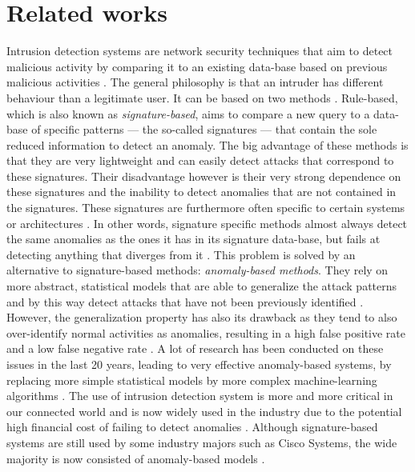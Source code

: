 \section{Related works}
Intrusion detection systems are network security techniques that aim to detect malicious activity by comparing it to an existing data-base based on previous malicious activities \cite{Amudhavel2016AReview}. The general philosophy is that an intruder has different behaviour than a legitimate user. It can be based on two methods \cite{Winter2018}. Rule-based, which is also known as \emph{signature-based}, aims to compare a new query to a data-base of specific patterns --- the so-called signatures --- that contain the sole reduced information to detect an anomaly. The big advantage of these methods is that they are very lightweight and can easily detect attacks that correspond to these signatures. Their disadvantage however is their very strong dependence on these signatures and the inability to detect anomalies that are not contained in the signatures. These signatures are furthermore often specific to certain systems or architectures \cite{Ilgun1995StateApproach}. In other words, signature specific methods almost always detect the same anomalies as the ones it has in its signature data-base, but fails at detecting anything that diverges from it \cite{Liao2013IntrusionReview}. This problem is solved by an alternative to signature-based methods: \emph{anomaly-based methods}. They rely on more abstract, statistical models that are able to generalize the attack patterns and by this way detect attacks that have not been previously identified \cite{Dali2015ASystem}. However, the generalization property has also its drawback as they tend to also over-identify normal activities as anomalies, resulting in a high false positive rate and a low false negative rate \cite{Mukherjee1994NetworkDetection}. A lot of research has been conducted on these issues in the last 20 years, leading to very effective anomaly-based systems, by replacing more simple statistical models by more complex machine-learning algorithms \cite{Tsai2010ADetection}. The use of intrusion detection system is more and more critical in our connected world and is now widely used in the industry due to the potential high financial cost of failing to detect anomalies \cite{Bhatt2014TheSystems,Rossi2009UnderstandingSignaling}. Although signature-based systems are still used by some industry majors such as Cisco Systems, the wide majority is now consisted of anomaly-based models \cite{Rubio2017AnalysisEcosystems}.

